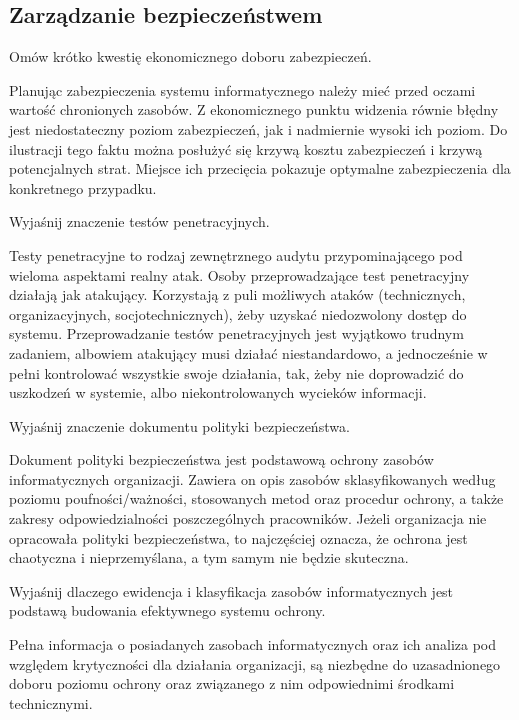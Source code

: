 \documentclass[answers,11pt]{exam}
\begin{document}
\subsection{Zarządzanie bezpieczeństwem}

\begin{questions}

\question Omów krótko kwestię ekonomicznego doboru zabezpieczeń.
\begin{solution}
Planując zabezpieczenia systemu informatycznego należy mieć przed oczami wartość chronionych zasobów. Z ekonomicznego punktu widzenia równie błędny jest niedostateczny poziom zabezpieczeń, jak i nadmiernie wysoki ich poziom. Do ilustracji tego faktu można posłużyć się krzywą kosztu zabezpieczeń i krzywą potencjalnych strat. Miejsce ich przecięcia pokazuje optymalne zabezpieczenia dla konkretnego przypadku. 
\end{solution}

\question Wyjaśnij znaczenie testów penetracyjnych.
\begin{solution}
Testy penetracyjne to rodzaj zewnętrznego audytu przypominającego pod wieloma aspektami realny atak. Osoby przeprowadzające test penetracyjny działają jak atakujący. Korzystają z puli możliwych ataków (technicznych, organizacyjnych, socjotechnicznych), żeby uzyskać niedozwolony dostęp do systemu. Przeprowadzanie testów penetracyjnych jest wyjątkowo trudnym zadaniem, albowiem atakujący musi działać niestandardowo, a jednocześnie w pełni kontrolować wszystkie swoje działania, tak, żeby nie doprowadzić do uszkodzeń w systemie, albo niekontrolowanych wycieków informacji.
\end{solution}

\question Wyjaśnij znaczenie dokumentu polityki bezpieczeństwa.
\begin{solution}
Dokument polityki bezpieczeństwa jest podstawową ochrony zasobów informatycznych organizacji. Zawiera on opis zasobów sklasyfikowanych według poziomu poufności/ważności, stosowanych metod oraz procedur ochrony, a także zakresy odpowiedzialności poszczególnych pracowników. 
Jeżeli organizacja nie opracowała polityki bezpieczeństwa, to najczęściej oznacza, że ochrona jest chaotyczna i nieprzemyślana, a tym samym nie będzie skuteczna.
\end{solution}


\question Wyjaśnij dlaczego ewidencja i klasyfikacja zasobów informatycznych jest podstawą budowania efektywnego systemu ochrony.
\begin{solution}
Pełna informacja o posiadanych zasobach informatycznych oraz ich analiza pod względem krytyczności dla działania organizacji, są niezbędne do uzasadnionego doboru poziomu ochrony oraz związanego z nim odpowiednimi środkami technicznymi. 


\end{solution}
\end{questions}
\end{document}
